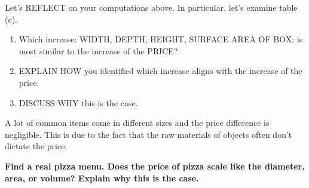 \documentclass[nooutcomes,noauthor,12pt,handout]{ximera}
\begin{document}




\begin{question}
  Let's REFLECT on your computations above. In particular, let's
  examine table (c).%
  \begin{enumerate}
    \item Which increase: WIDTH, DEPTH, HEIGHT, SURFACE AREA OF BOX;
      is most similar to the increase of the PRICE?
    \item EXPLAIN HOW you identified which increase aligns with the
      increase of the price.
    \item DISCUSS WHY this is the case.
  \end{enumerate}
\end{question}
\mynewpage


\begin{question}
  A lot of common items come in different sizes and the price
  difference is negligible. This is due to the fact that the raw
  materials of objects often don't dictate the price.

  \textbf{Find a real pizza menu. Does the price of pizza scale like the
  diameter, area, or volume?  Explain why this is the case.}
 
\end{question}
\end{document}
